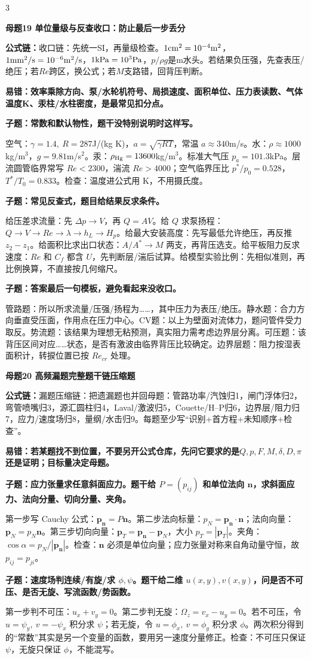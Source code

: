 \documentclass[a4paper]{article}
\newcommand{\mt}[1]{\vspace{0.22pt}\colorbox{M}{\parbox{\dimexpr\linewidth-2\fboxsep}{\color{white}\bfseries #1}}\par}
\newcommand{\qt}[1]{\vspace{0.10pt}\colorbox{Q}{\parbox{\dimexpr\linewidth-2\fboxsep}{\color{white}\bfseries #1}}\par}
\newcommand{\ans}[1]{\colorbox{G}{\parbox{\dimexpr\linewidth-2\fboxsep}{#1}}\par}
\newcommand{\warn}[1]{\colorbox{Y}{\parbox{\dimexpr\linewidth-2\fboxsep}{\color{E}\bfseries #1}}\par}
\newcommand{\form}[1]{{\color{M}\bfseries 公式链：}#1\par}
\begin{document}
\begin{multicols}{3}
\mt{母题19 单位量级与反查收口：防止最后一步丢分}
\form{收口链：先统一SI，再量级检查。$1{\rm cm^2}=10^{-4}{\rm m^2}$，$1{\rm mm^2/s}=10^{-6}{\rm m^2/s}$，$1{\rm kPa}=10^3{\rm Pa}$，$p/\rho g$是m水头。若结果负压强，先查表压/绝压；若$Re$跨区，换公式；若$M$支路错，回背压判断。}
\warn{易错：效率乘除方向、泵/水轮机符号、局损速度、面积单位、压力表读数、气体温度K、汞柱/水柱密度，是最常见扣分点。}
\qt{子题：常数和默认物性，题干没特别说明时这样写。}
\ans{空气：$\gamma=1.4,\ R=287$J/(kg K)，$a=\sqrt{\gamma RT}$，常温 $a\approx340$m/s。水：$\rho\approx1000$kg/m$^3$，$g=9.81$m/s$^2$。汞：$\rho_{\rm Hg}=13600$kg/m$^3$。标准大气压 $p_a=101.3$kPa。层流圆管临界常写 $Re<2300$，湍流 $Re>4000$；空气临界压比 $p^*/p_0=0.528$，$T^*/T_0=0.833$。检查：温度进公式用 K，不用摄氏度。}
\qt{子题：常见反查式，题目给结果反求条件。}
\ans{给压差求流量：先 $\Delta p\to V$，再 $Q=AV$。给 $Q$ 求泵扬程：$Q\to V\to Re\to\lambda\to h_L\to H_p$。给最大安装高度：先写最低允许绝压，再反推 $z_2-z_1$。给面积比求出口状态：$A/A^*\to M$ 两支，再背压选支。给平板阻力反求速度：$Re$ 和 $C_f$ 都含 $U$，先判断层/湍后试算。给模型实验比例：先相似准则，再比例换算，不直接按几何缩尺。}
\qt{子题：答案最后一句模板，避免看起来没收口。}
\ans{管路题：所以所求流量/压强/扬程为……，其中压力为表压/绝压。静水题：合力方向垂直受压面，作用点在压力中心。CV题：以上为壁面对流体力，题问管件受力取反。势流题：该结果为理想无粘预测，真实阻力需考虑边界层分离。可压题：该背压区间对应……状态，是否有激波由临界背压比较确定。边界层题：阻力按湿表面积计，转捩位置已按 $Re_{cr}$ 处理。}
\mt{母题20 高频漏题完整题干链压缩题}
\form{漏题压缩链：把遗漏题也并回母题：管路功率/汽蚀归1，闸门浮体归2，弯管喷嘴归3，源汇圆柱归4，Laval/激波归5，Couette/H--P归6，边界层/阻力归7，应力/速度场归8，量纲/水击归9。每题至少写“识别+首方程+未知顺序+检查”。}
\warn{易错：若某题找不到位置，不要另开公式仓库，先问它要求的是$Q,p,F,M,\delta,D,\pi$还是证明；目标量决定母题。}
\qt{子题：应力张量求任意斜面应力。题干给 $P=(p_{ij})$ 和单位法向 $\bm n$，求斜面应力、法向分量、切向分量、夹角。}
\ans{第一步写 Cauchy 公式：$\bm p_{\bm n}=P\bm n$。第二步法向标量：$p_N=\bm p_{\bm n}\cdot\bm n$；法向向量：$\bm p_N=p_N\bm n$。第三步切向向量：$\bm p_T=\bm p_{\bm n}-\bm p_N$，大小 $p_T=|\bm p_T|$。夹角：$\cos\alpha=p_N/|\bm p_{\bm n}|$。检查：$\bm n$ 必须是单位向量；应力张量对称来自角动量守恒，故 $p_{ij}=p_{ji}$。}
\qt{子题：速度场判连续/有旋/求 $\phi,\psi$。题干给二维 $u(x,y),v(x,y)$，问是否不可压、是否无旋、写流函数/势函数。}
\ans{第一步判不可压：$u_x+v_y=0$。第二步判无旋：$\Omega_z=v_x-u_y=0$。若不可压，令 $u=\psi_y,\ v=-\psi_x$ 积分求 $\psi$；若无旋，令 $u=\phi_x,\ v=\phi_y$ 积分求 $\phi$。两次积分得到的“常数”其实是另一个变量的函数，要用另一速度分量修正。检查：不可压只保证 $\psi$，无旋只保证 $\phi$，不能混写。}

\end{multicols}
\end{document}
